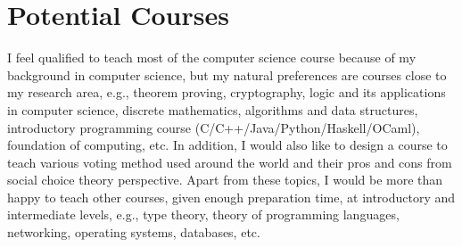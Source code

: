 \documentclass[a4paper]{article}
\begin{document}
\section{Potential Courses}
I feel qualified to teach most of the computer science course 
because of my background in computer science, but 
my natural preferences are courses close to my research 
area, e.g., theorem proving, cryptography, logic 
and its applications in computer science, discrete 
mathematics, algorithms and data structures, 
introductory programming course (C/C++/Java/Python/Haskell/OCaml),
foundation of computing, etc. 
In addition, I would also like to design a course to teach 
various voting method used around the world and 
their pros and cons from social choice theory perspective. 
Apart from these topics, I would 
be more than happy to teach other courses, given enough 
preparation time, at introductory and 
intermediate levels, e.g., type theory, theory of programming 
languages, networking, operating systems, databases, etc.
\end{document}
